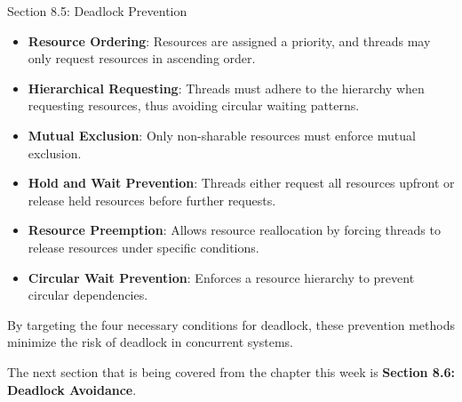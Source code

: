 \begin{notes}{Section 8.5: Deadlock Prevention}
    \begin{highlight}
    
        \begin{itemize}
            \item \textbf{Resource Ordering}: Resources are assigned a priority, and threads may only request resources in ascending order.
            \item \textbf{Hierarchical Requesting}: Threads must adhere to the hierarchy when requesting resources, thus avoiding circular waiting patterns.
        \end{itemize}
    
    \end{highlight}
    
    \begin{highlight}
    
        \begin{itemize}
            \item \textbf{Mutual Exclusion}: Only non-sharable resources must enforce mutual exclusion.
            \item \textbf{Hold and Wait Prevention}: Threads either request all resources upfront or release held resources before further requests.
            \item \textbf{Resource Preemption}: Allows resource reallocation by forcing threads to release resources under specific conditions.
            \item \textbf{Circular Wait Prevention}: Enforces a resource hierarchy to prevent circular dependencies.
        \end{itemize}
    
    By targeting the four necessary conditions for deadlock, these prevention methods minimize the risk of deadlock in concurrent systems.
    
    \end{highlight}
\end{notes}

The next section that is being covered from the chapter this week is \textbf{Section 8.6: Deadlock Avoidance}.

